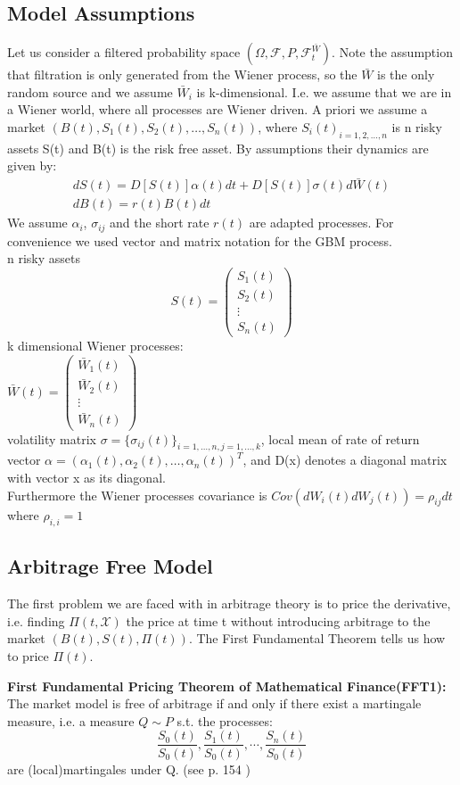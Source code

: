 \subsection{Model Assumptions}
Let us consider a filtered probability space $(\Omega, \mathcal{F}, P, \mathcal{F}_t^{\bar{W}})$. Note the assumption that filtration is only generated from the Wiener process, so the $\bar{W}$ is the only random source and we assume $\bar{W}_i$ is k-dimensional. I.e. we assume that we are in a Wiener world, where all processes are Wiener driven. A priori we assume a market $(B(t),S_1(t), S_2(t),\ldots, S_n(t))$, where ${S_i(t)}_{i=1,2,\ldots,n}$ is n risky assets S(t) and B(t) is the risk free asset. By assumptions their dynamics are given by:\\
\begin{align}
dS(t)=D[S(t)]\alpha(t)dt+D[S(t)]\sigma(t)d\bar{W}(t)\label{GBM-P} \\
dB(t)=r(t)B(t)dt
\end{align}
We assume $\alpha_i$, $\sigma_{ij}$ and the short rate $r(t)$ are adapted processes.
For convenience we used vector and matrix notation for the GBM process.\\
n risky assets
$$S(t)=\begin{pmatrix}
S_1(t)\\
S_2(t)\\
\vdots\\
S_n(t)
\end{pmatrix}
$$
k dimensional Wiener processes:\\
$\bar{W}(t)=\begin{pmatrix}
\bar{W}_1(t)\\
\bar{W}_2(t)\\
\vdots\\
\bar{W}_n(t)
\end{pmatrix}
$\\
volatility matrix $\sigma=\{\sigma_{ij}(t)\}_{i=1,\ldots,n,j=1,\ldots,k}$, local mean of rate of return vector $\alpha=(\alpha_1(t), \alpha_2(t), \ldots, \alpha_n(t))^T$, and D(x) denotes a diagonal matrix with vector x as its diagonal.\\ 
Furthermore the Wiener processes covariance is $Cov(dW_i(t)dW_j(t))=\rho_{ij}dt$ where $\rho_{i,i}=1$

\subsection{Arbitrage Free Model}
The first problem we are faced with in arbitrage theory is to price the derivative, i.e. finding $\Pi(t,\mathcal{X})$ the price at time t without introducing arbitrage to the market $(B(t), S(t), \Pi(t))$. The First Fundamental Theorem tells us how to price $\Pi(t)$.
\begin{theorem}\label{FFT1}
\textbf{First Fundamental Pricing Theorem of Mathematical Finance(FFT1): } The market model is free of arbitrage if and only if there exist a martingale measure, i.e. a measure $Q\sim P$ s.t. the processes:
$$\frac{S_0(t)}{S_0(t)}, \frac{S_1(t)}{S_0(t)}, \cdots, \frac{S_n(t)}{S_0(t)}$$
are (local)martingales under Q.
(see p. 154 \parencite{finKont})
\end{theorem}

